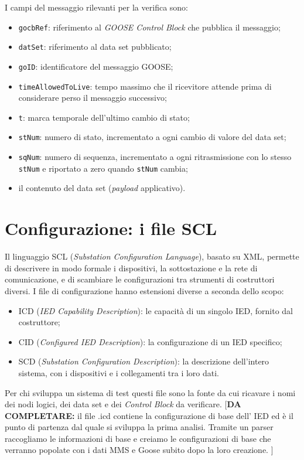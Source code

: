 \documentclass[11pt,a4paper,italian,oneside,openany]{book}
\newcommand{\daf}[1]{{\color{red}[\textbf{DA COMPLETARE:} #1]}}
\begin{document}
I campi del messaggio rilevanti per la verifica sono:
\begin{itemize}
    \item \texttt{gocbRef}: riferimento al \textit{GOOSE Control Block} che pubblica il messaggio;
    \item \texttt{datSet}: riferimento al data set pubblicato;
    \item \texttt{goID}: identificatore del messaggio GOOSE;
    \item \texttt{timeAllowedToLive}: tempo massimo che il ricevitore attende prima di considerare perso il messaggio successivo;
    \item \texttt{t}: marca temporale dell'ultimo cambio di stato;
    \item \texttt{stNum}: numero di stato, incrementato a ogni cambio di valore del data set;
    \item \texttt{sqNum}: numero di sequenza, incrementato a ogni ritrasmissione con lo stesso \texttt{stNum} e riportato a zero quando \texttt{stNum} cambia;
    \item il contenuto del data set (\textit{payload} applicativo).
\end{itemize}

\section{Configurazione: i file SCL}
Il linguaggio SCL (\textit{Substation Configuration Language}), basato su XML, permette di descrivere in modo formale i dispositivi, la sottostazione e la rete di comunicazione, e di scambiare le configurazioni tra strumenti di costruttori diversi. I file di configurazione hanno estensioni diverse a seconda dello scopo:
\begin{itemize}
    \item ICD (\textit{IED Capability Description}): le capacità di un singolo IED, fornito dal costruttore;
    \item CID (\textit{Configured IED Description}): la configurazione di un IED specifico;
    \item SCD (\textit{Substation Configuration Description}): la descrizione dell'intero sistema, con i dispositivi e i collegamenti tra i loro dati.
\end{itemize}
Per chi sviluppa un sistema di test questi file sono la fonte da cui ricavare i nomi dei nodi logici, dei data set e dei \textit{Control Block} da verificare. \daf{il file .icd contiene la configurazione di base dell' IED ed è il punto di partenza dal quale si sviluppa la prima analisi. Tramite un parser raccogliamo le informazioni di base e creiamo le configurazioni di base che verranno popolate con i dati MMS e Goose subito dopo la loro creazione. }
\end{document}
